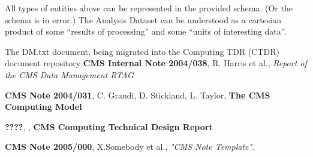 \documentclass{cmspaper}
\begin{document}
All types of entities above can be represented in the provided schema.  (Or the schema
is in error.)  The Analysis Dataset can be understood as a cartesian product of some
``results of processing'' and some ``units of interesting data''.  


\begin{thebibliography}{9}
   The DM.txt document, being migrated into the Computing
      TDR (CTDR) document repository
   {\bf CMS Internal Note 2004/038}, R. Harris et al., 
    {\it Report of the CMS Data Management RTAG}

   {\bf CMS Note 2004/031}, C. Grandi, D. Stickland,
               L. Taylor, {\bf The CMS Computing Model}

   {\bf ????}, , {\bf CMS Computing Technical Design Report}

   {\bf CMS Note 2005/000},
    X.Somebody et al.,
    {\em "CMS Note Template"}.
\end{thebibliography}
 
\pagebreak
\end{document}
